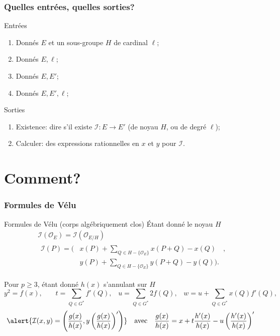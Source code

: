 \documentclass[10pt]{beamer}
\renewcommand{\ge}{\geqslant}  %
\newcommand{\0}{\mathcal{O}}  %
\newcommand{\isog}[1]{\mathcal{#1}}  %
\newcommand{\I}{\isog{I}}  %
\begin{document}
\begin{frame}
  \frametitle{Quelles entrées, quelles sorties?}

  \begin{block}{Entrées}
    \begin{enumerate}
    \item Donnés $E$ et un sous-groupe $H$ de cardinal $\ell$;
    \item Donnés $E, \ell$;
    \item Donnés $E, E'$;
    \item Donnés $E, E', \ell$;
    \end{enumerate}
  \end{block}

  \begin{block}{Sorties}
    \begin{enumerate}
    \item Existence: dire s'il existe $\I:E\to E'$ (de noyau $H$, ou de degré $\ell$);
    \item Calculer: des expressions rationnelles en $x$ et $y$ pour $\I$.
    \end{enumerate}
  \end{block}
\end{frame}


\section{Comment?}


\begin{frame}
  \frametitle{Formules de Vélu}
  
  \begin{block}{Formules de Vélu (corps algébriquement clos)}
    Étant donné le noyau $H$
    \begin{align*}
      &\I(\0_E) = \I(\0_{E/H})\\
      &\begin{aligned}
        \I(P) = \Biggl( &x(P) + \sum_{Q\in H - \{\0_E\}}x(P+Q) - x(Q) \quad,\\
        &y(P) + \sum_{Q\in H - \{\0_E\}}y(P+Q) - y(Q) \Biggr) \text{.}
      \end{aligned}
    \end{align*}
  \end{block}

  \begin{block}{Pour $p\ge 3$, étant donné $h(x)$ s'annulant sur $H$}
    {\footnotesize
      \[
      y^2 = f(x)\text{,}
      \qquad
      t = \sum_{Q\in G^\ast} f'(Q)\text{,}
      \quad
      u = \sum_{Q\in G^\ast} 2f(Q)\text{,}
      \quad
      w = u + \sum_{Q\in G^\ast} x(Q)f'(Q)\text{,}\]}
    \[\alert{\I(x,y) = \left(\frac{g(x)}{h(x)}, y\left(\frac{g(x)}{h(x)}\right)'\right)}
    \quad\text{avec}\quad
    \frac{g(x)}{h(x)} = x + t\frac{h'(x)}{h(x)} - u\left(\frac{h'(x)}{h(x)}\right)'\]
  \end{block}
\end{frame}
\end{document}
